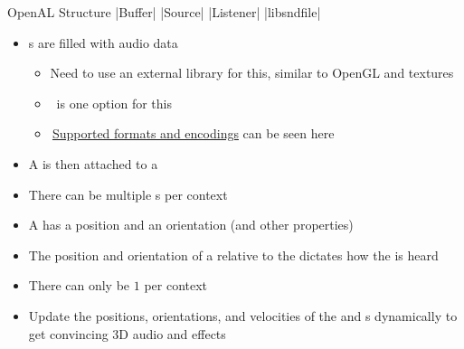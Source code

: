 \documentclass{beamer}
\newcommand{\hrefhand}[2]{\raisebox{-0.4ex}{\HandRight}\,\href{#1}{#2}}
\begin{document}
\begin{frame}[fragile]{OpenAL Structure}
    |Buffer|
    |Source|
    |Listener|
    |libsndfile|
    \begin{itemize}
        \item {\color{blue}}s are filled with audio data
              \begin{itemize}
                  \item Need to use an external library for this, similar to OpenGL and textures
                  \item \hrefhand{http://libsndfile.github.io/libsndfile/}{\color{blue}\UseVerb{libsndfile}} is one option for this
                  \item \hrefhand{http://libsndfile.github.io/libsndfile/formats.html}{\color{blue}Supported formats and encodings} can be seen here
              \end{itemize}
        \item A {\color{blue}} is then attached to a {\color{blue}}
        \item There can be multiple {\color{blue}}s per context
        \item A {\color{blue}} has a position and an orientation (and other properties)
        \item The position and orientation of a {\color{blue}} relative to the {\color{blue}
                      } dictates how the {\color{blue}} is heard
        \item There can only be $1$ {\color{blue}} per context
        \item Update the positions, orientations, and velocities of the {\color{blue}} and
                  {\color{blue}}s dynamically to get convincing 3D audio and effects
    \end{itemize}
\end{frame}
\end{document}
